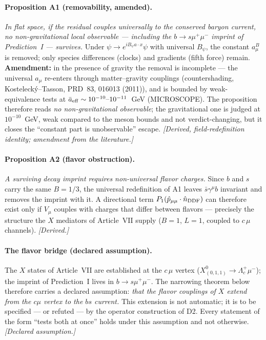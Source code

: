 \paragraph{Proposition A1 (removability, amended).}
\textit{In flat space, if the residual couples universally to the conserved
baryon current, no non-gravitational local observable --- including the
$b\to s\mu^+\mu^-$ imprint of Prediction~I --- survives.}
Under $\psi\to e^{iB_\psi a\cdot x}\psi$ with universal $B_\psi$, the constant
$a_\mu^B$ is removed; only species differences (clocks) and gradients (fifth
force) remain. \textbf{Amendment:} in the presence of gravity the removal is
incomplete --- the universal $a_\mu$ re-enters through matter--gravity couplings
(countershading, Kosteleck\'y--Tasson, PRD~83, 016013 (2011)), and is bounded by
weak-equivalence tests at $\bar a_{\rm eff}\sim10^{-10}\text{--}10^{-11}$~GeV
(MICROSCOPE). The proposition therefore reads \emph{no non-gravitational
observable}; the gravitational one is judged at $10^{-10}$~GeV, weak compared to
the meson bounds and not verdict-changing, but it closes the ``constant part is
unobservable'' escape. \textit{[Derived, field-redefinition identity; amendment
from the literature.]}

\paragraph{Proposition A2 (flavor obstruction).}
\textit{A surviving decay imprint requires non-universal flavor charges.}
Since $b$ and $s$ carry the same $B=1/3$, the universal redefinition of A1
leaves $\bar s\gamma^\mu b$ invariant and removes the imprint with it. A
directional term $P_1(\hat p_{\mu\mu}\cdot\hat n_{\rm DDF})$ can therefore
exist only if $V_\mu$ couples with charges that differ between flavors ---
precisely the structure the $X$ mediators of Article~VII supply
($B=1$, $L=1$, coupled to $c\,\mu$ channels). \textit{[Derived.]}

\paragraph{The flavor bridge (declared assumption).}
The $X$ states of Article~VII are established at the $c\,\mu$ vertex
($X^0_{(0,1,1)}\to\Lambda_c^+\mu^-$); the imprint of Prediction~I lives in
$b\to s\mu^+\mu^-$. The narrowing theorem below therefore carries a declared
assumption: \emph{that the flavor couplings of $X$ extend from the $c\mu$
vertex to the $bs$ current.} This extension is not automatic; it is to be
specified --- or refuted --- by the operator construction of D2. Every
statement of the form ``tests both at once'' holds under this assumption and
not otherwise. \textit{[Declared assumption.]}

